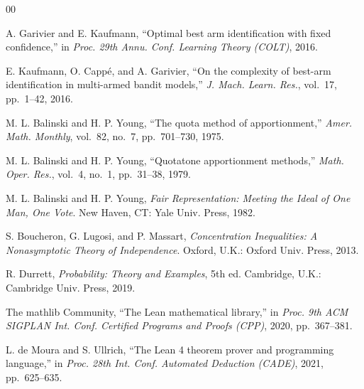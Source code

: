 \documentclass[conference]{IEEEtran}
\theoremstyle{definition}
\begin{document}
\begin{thebibliography}{00}

 A. Garivier and E. Kaufmann, ``Optimal best arm identification with
fixed confidence,'' in \emph{Proc. 29th Annu. Conf. Learning Theory (COLT)}, 2016.

 E. Kaufmann, O. Capp\'e, and A. Garivier, ``On the complexity of
best-arm identification in multi-armed bandit models,'' \emph{J. Mach. Learn. Res.},
vol.~17, pp.~1--42, 2016.

 M. L. Balinski and H. P. Young, ``The quota method of
apportionment,'' \emph{Amer. Math. Monthly}, vol.~82, no.~7, pp.~701--730, 1975.

 M. L. Balinski and H. P. Young, ``Quotatone apportionment methods,''
\emph{Math. Oper. Res.}, vol.~4, no.~1, pp.~31--38, 1979.

 M. L. Balinski and H. P. Young, \emph{Fair Representation: Meeting the
Ideal of One Man, One Vote}. New Haven, CT: Yale Univ. Press, 1982.

 S. Boucheron, G. Lugosi, and P. Massart, \emph{Concentration
Inequalities: A Nonasymptotic Theory of Independence}. Oxford, U.K.: Oxford Univ. Press, 2013.

 R. Durrett, \emph{Probability: Theory and Examples}, 5th ed. Cambridge,
U.K.: Cambridge Univ. Press, 2019.

 The mathlib Community, ``The Lean mathematical library,'' in
\emph{Proc. 9th ACM SIGPLAN Int. Conf. Certified Programs and Proofs (CPP)}, 2020,
pp.~367--381.

 L. de Moura and S. Ullrich, ``The Lean 4 theorem prover and programming
language,'' in \emph{Proc. 28th Int. Conf. Automated Deduction (CADE)}, 2021, pp.~625--635.

\end{thebibliography}


\end{document}

